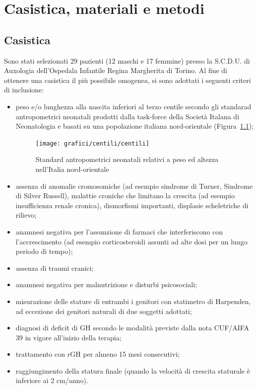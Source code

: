 \chapter{Casistica, materiali e metodi}

\section{Casistica}

Sono stati selezionati 29 pazienti (12 maschi e 17 femmine) presso la S.C.D.U. di Auxologia dell'Ospedala Infantile Regina Margherita di Torino. Al fine di ottenere una casistica il più possibile omogenea, si sono adottati i seguenti criteri di inclusione:
\begin{itemize}
\item peso e/o lunghezza alla nascita inferiori al terzo centile secondo gli standarad antropometrici neonatali prodotti dalla task-force della Società Italana di Neonatologia e basati su una popolazione italiana nord-orientale (Figura~\ref{fig:StandardNeonataliNordOccidentali});
\begin{figure}[!h]
  \begin{center}
      \texttt{[image: grafici/centili/centili]} %
  \end{center}
  \caption{Standard antropometrici neonatali relativi a peso ed altezza nell'Italia nord-orientale}
  \label{fig:StandardNeonataliNordOccidentali}
\end{figure}
\item assenza di anomalie cromosomiche (ad esempio sindrome di Turner, Sindrome di Silver Russell), malattie croniche che limitano la crescita (ad esempio insufficienza renale cronica), dismorfismi importanti, displasie scheletriche di rilievo;
\item anamnesi negativa per l'assunzione di farmaci che interferiscono con l'accrescimento (ad esempio corticosteroidi assunti ad alte dosi per un lungo periodo di tempo);
\item assenza di traumi cranici;
\item anamnesi negativa per malnutrizione e disturbi psicosociali;
\item misurazione delle stature di entrambi i genitori con statimetro di Harpenden, ad eccezione dei genitori naturali di due soggetti adottati;
\item diagnosi di deficit di GH secondo le modalità previste dalla nota CUF/AIFA 39 in vigore all'inizio della terapia;
\item trattamento con rGH per almeno 15 mesi consecutivi;
\item raggiungimento della statura finale (quando la velocità di crescita staturale è inferiore ai 2 cm/anno). 
\end{itemize}


